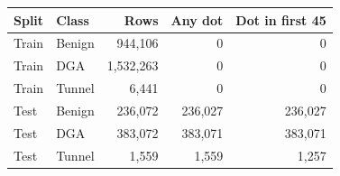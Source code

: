 \centering\footnotesize
\begin{tabular}{@{}llrrr@{}}
\toprule
Split & Class & Rows & Any dot & Dot in first 45\\\midrule
Train & Benign & 944,106 & 0 & 0\\
Train & DGA & 1,532,263 & 0 & 0\\
Train & Tunnel & 6,441 & 0 & 0\\
Test & Benign & 236,072 & 236,027 & 236,027\\
Test & DGA & 383,072 & 383,071 & 383,071\\
Test & Tunnel & 1,559 & 1,559 & 1,257\\
\bottomrule
\end{tabular}
